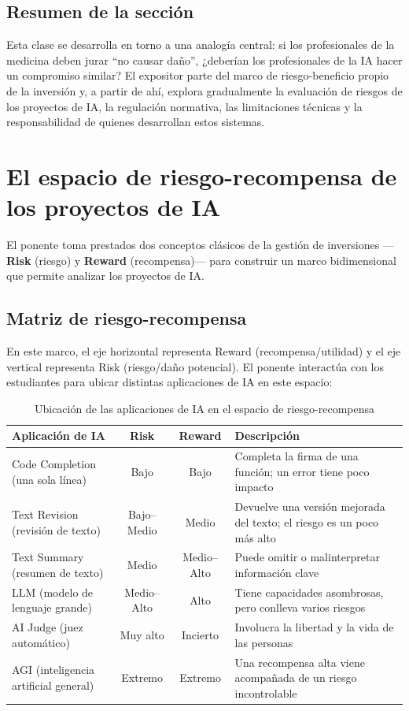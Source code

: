 \documentclass[a4paper]{article}
\begin{document}
\subsection{Resumen de la sección}

Esta clase se desarrolla en torno a una analogía central: si los profesionales de la medicina deben jurar ``no causar daño'', ¿deberían los profesionales de la IA hacer un compromiso similar? El expositor parte del marco de riesgo-beneficio propio de la inversión y, a partir de ahí, explora gradualmente la evaluación de riesgos de los proyectos de IA, la regulación normativa, las limitaciones técnicas y la responsabilidad de quienes desarrollan estos sistemas.
\section{El espacio de riesgo-recompensa de los proyectos de IA}

El ponente toma prestados dos conceptos clásicos de la gestión de inversiones —\textbf{Risk} (riesgo) y \textbf{Reward} (recompensa)— para construir un marco bidimensional que permite analizar los proyectos de IA.

\subsection{Matriz de riesgo-recompensa}

En este marco, el eje horizontal representa Reward (recompensa/utilidad) y el eje vertical representa Risk (riesgo/daño potencial). El ponente interactúa con los estudiantes para ubicar distintas aplicaciones de IA en este espacio:

\begin{table}[H]
\centering
\caption{Ubicación de las aplicaciones de IA en el espacio de riesgo-recompensa}
\begin{tabular}{@{}lccl@{}}
\toprule
\textbf{Aplicación de IA} & \textbf{Risk} & \textbf{Reward} & \textbf{Descripción} \\
\midrule
Code Completion (una sola línea) & Bajo & Bajo & Completa la firma de una función; un error tiene poco impacto \\
Text Revision (revisión de texto) & Bajo--Medio & Medio & Devuelve una versión mejorada del texto; el riesgo es un poco más alto \\
Text Summary (resumen de texto) & Medio & Medio--Alto & Puede omitir o malinterpretar información clave \\
LLM (modelo de lenguaje grande) & Medio--Alto & Alto & Tiene capacidades asombrosas, pero conlleva varios riesgos \\
AI Judge (juez automático) & Muy alto & Incierto & Involucra la libertad y la vida de las personas \\
AGI (inteligencia artificial general) & Extremo & Extremo & Una recompensa alta viene acompañada de un riesgo incontrolable \\
\bottomrule
\end{tabular}
\end{table}
\end{document}

